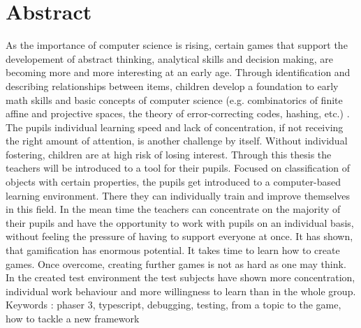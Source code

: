 
\chapter*{Abstract}

As the importance of computer science is rising, certain games that support the
developement of abstract thinking, analytical skills and decision making, are
becoming more and more interesting at an early age. Through identification and
describing relationships between items, children develop a foundation to early
math skills and basic concepts of computer science (e.g. combinatorics of finite
affine and projective spaces, the theory of error-correcting codes, hashing, etc.)
\cite{SET}. The pupils individual learning speed and lack of concentration, if
not receiving the right amount of attention, is another challenge by itself.
Without individual fostering, children are at high risk of losing interest.
Through this thesis the teachers will be introduced to a tool for their pupils.
Focused on classification of objects with certain properties, the pupils get
introduced to a computer-based learning environment. There they can individually
train and improve themselves in this field. In the mean time the teachers can
concentrate on the majority of their pupils and have the opportunity to work with
pupils on an individual basis, without feeling the pressure of having to support
everyone at once.
It has shown, that gamification has enormous potential. It takes time to learn how
to create games. Once overcome, creating further games is not as hard as one may think.
In the created test environment the test subjects have shown more concentration,
individual work behaviour and more willingness to learn than in the whole group.
Keywords : phaser 3, typescript, debugging, testing, from a topic to the game, how to tackle a new framework
